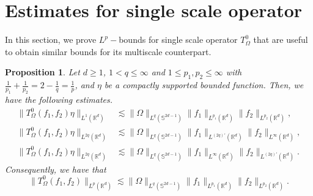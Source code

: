 \documentclass[a4paper,reqno]{amsart}
\newcommand{\R}{{\mathbb R}}       %
\newcommand{\Sp}{{\mathbb S}}
\newtheorem{proposition}[theorem]{Proposition}
\theoremstyle{definition}
\numberwithin{equation}{section}
\begin{document}
\section{Estimates for single scale operator}\label{sec:singlescale}
In this section, we prove $L^p-$bounds for single scale operator $T_\Omega^0$ that are useful to obtain similar bounds for its multiscale counterpart.
\begin{proposition}
	Let $d\geq1$, $1<q\leq\infty$ and $1\leq p_1,p_2\leq\infty$ with $\frac{1}{p_1}+\frac{1}{p_2}=2-\frac{1}{q}=\frac{1}{p}$, and $\eta$ be a compactly supported bounded function. Then, we have the following estimates.
		\begin{align}
			\|T^0_\Omega(f_1,f_2)\eta\|_{L^1(\R^d)}&\lesssim\|\Omega\|_{L^q(\Sp^{2d-1})}\|f_1\|_{{L^{p_1}(\R^d)}}\|f_2\|_{{L^{p_2}(\R^d)}},\label{singlescale:L1bound}\\
			\|T^0_\Omega(f_1,f_2)\eta\|_{L^{2q}(\R^d)}&\lesssim\|\Omega\|_{L^q(\Sp^{2d-1})}\|f_1\|_{{L^{(2q)'}(\R^d)}}\|f_2\|_{{L^{\infty}(\R^d)}}\label{singlescale:2qbound1},\\
			\|T^0_\Omega(f_1,f_2)\eta\|_{L^{2q}(\R^d)}&\lesssim\|\Omega\|_{L^q(\Sp^{2d-1})}\|f_1\|_{{L^{\infty}(\R^d)}}\|f_2\|_{{L^{(2q)'}(\R^d)}}\label{singlescale:2qbound2}.
		\end{align}
		Consequently, we have that
		\begin{equation}\label{singlescale:Lpbound}
			\|T^0_\Omega(f_1,f_2)\|_{{L^{p}(\R^d)}}\lesssim\|\Omega\|_{L^q(\Sp^{2d-1})}\|f_1\|_{{L^{p_1}(\R^d)}}\|f_2\|_{{L^{p_2}(\R^d)}}.
		\end{equation}
\end{proposition}
\end{document}
